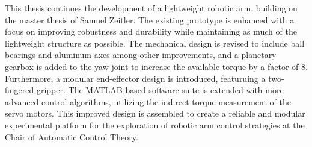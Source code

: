 This thesis continues the development of a lightweight robotic arm, building on the master thesis of Samuel Zeitler.
The existing prototype is enhanced with a focus on improving robustness and durability while maintaining as much of the
lightweight structure as possible. The mechanical design is revised to include ball bearings and aluminum axes among other improvements,
and a planetary gearbox is added to the yaw joint to increase the available torque by a factor of 8.
Furthermore, a modular end-effector design is introduced, featuruing a two-fingered gripper.
The MATLAB-based software suite is extended with more advanced control algorithms, utilizing the indirect
torque measurement of the servo motors. This improved design is assembled to create a reliable and modular experimental
platform for the exploration of robotic arm control strategies at the Chair of Automatic Control Theory.
